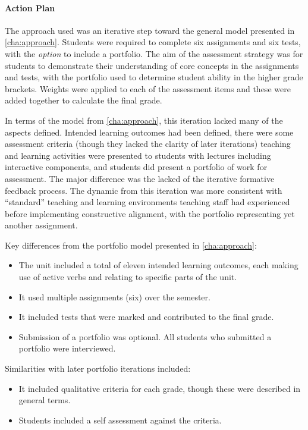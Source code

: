 \paragraph{Action Plan} %

The approach used was an iterative step toward the general model presented in \cref{cha:approach}. Students were required to complete six assignments and six tests, with the \emph{option} to include a portfolio. The aim of the assessment strategy was for students to demonstrate their understanding of core concepts in the assignments and tests, with the portfolio used to determine student ability in the higher grade brackets. Weights were applied to each of the assessment items and these were added together to calculate the final grade.

In terms of the model from \cref{cha:approach}, this iteration lacked many of the aspects defined. Intended learning outcomes had been defined, there were some assessment criteria (though they lacked the clarity of later iterations) teaching and learning activities were presented to students with lectures including interactive components, and students did present a portfolio of work for assessment. The major difference was the lacked of the iterative formative feedback process. The dynamic from this iteration was more consistent with ``standard'' teaching and learning environments teaching staff had experienced before implementing constructive alignment, with the portfolio representing yet another assignment.

Key differences from the portfolio model presented in \cref{cha:approach}:
\begin{itemize}[noitemsep,nolistsep]
  \item The unit included a total of eleven intended learning outcomes, each making use of active verbs and relating to specific parts of the unit.
  \item It used multiple assignments (six) over the semester.
  \item It included tests that were marked and contributed to the final grade.
  \item Submission of a portfolio was optional.  All students who submitted a portfolio were interviewed.
\end{itemize}

Similarities with later portfolio iterations included:
\begin{itemize}[noitemsep,nolistsep]
  \item It included qualitative criteria for each grade, though these were described in general terms.
  \item Students included a self assessment against the criteria.
\end{itemize}

